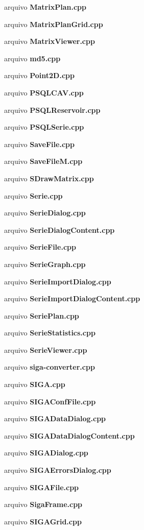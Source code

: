 \begin{DoxyCompactItemize}
\item 
arquivo {\bf Matrix\+Plan.\+cpp}
\item 
arquivo {\bf Matrix\+Plan\+Grid.\+cpp}
\item 
arquivo {\bf Matrix\+Viewer.\+cpp}
\item 
arquivo {\bf md5.\+cpp}
\item 
arquivo {\bf Point2\+D.\+cpp}
\item 
arquivo {\bf P\+S\+Q\+L\+C\+A\+V.\+cpp}
\item 
arquivo {\bf P\+S\+Q\+L\+Reservoir.\+cpp}
\item 
arquivo {\bf P\+S\+Q\+L\+Serie.\+cpp}
\item 
arquivo {\bf Save\+File.\+cpp}
\item 
arquivo {\bf Save\+File\+M.\+cpp}
\item 
arquivo {\bf S\+Draw\+Matrix.\+cpp}
\item 
arquivo {\bf Serie.\+cpp}
\item 
arquivo {\bf Serie\+Dialog.\+cpp}
\item 
arquivo {\bf Serie\+Dialog\+Content.\+cpp}
\item 
arquivo {\bf Serie\+File.\+cpp}
\item 
arquivo {\bf Serie\+Graph.\+cpp}
\item 
arquivo {\bf Serie\+Import\+Dialog.\+cpp}
\item 
arquivo {\bf Serie\+Import\+Dialog\+Content.\+cpp}
\item 
arquivo {\bf Serie\+Plan.\+cpp}
\item 
arquivo {\bf Serie\+Statistics.\+cpp}
\item 
arquivo {\bf Serie\+Viewer.\+cpp}
\item 
arquivo {\bf siga-\/converter.\+cpp}
\item 
arquivo {\bf S\+I\+G\+A.\+cpp}
\item 
arquivo {\bf S\+I\+G\+A\+Conf\+File.\+cpp}
\item 
arquivo {\bf S\+I\+G\+A\+Data\+Dialog.\+cpp}
\item 
arquivo {\bf S\+I\+G\+A\+Data\+Dialog\+Content.\+cpp}
\item 
arquivo {\bf S\+I\+G\+A\+Dialog.\+cpp}
\item 
arquivo {\bf S\+I\+G\+A\+Errors\+Dialog.\+cpp}
\item 
arquivo {\bf S\+I\+G\+A\+File.\+cpp}
\item 
arquivo {\bf Siga\+Frame.\+cpp}
\item 
arquivo {\bf S\+I\+G\+A\+Grid.\+cpp}

\end{DoxyCompactItemize}
